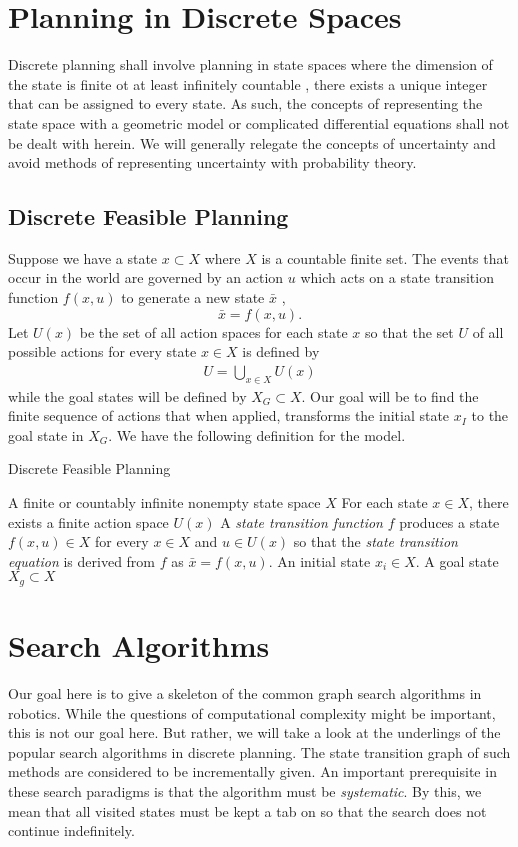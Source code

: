 \section{Planning in Discrete Spaces}
Discrete planning shall involve planning in state spaces where the dimension of the state is finite ot at least infinitely countable \ie, there exists a unique integer that can be assigned to every state. As such, the concepts of representing the state space with a geometric model or complicated differential equations shall not be dealt with herein. We will generally relegate the concepts of uncertainty and avoid methods of representing uncertainty with probability theory.

\subsection{Discrete Feasible Planning}
Suppose we have a state $x \subset X$  where $X$ is a countable finite set.  The events that occur in the world are governed by an action $u$ which acts on a state transition function $f(x, u)$ to generate a new state $\bar{x}$ \ie, 
\[
\bar{x} = f(x, u).
\]
%
Let $U(x)$ be the set of all action spaces for each state $x$ so that the set $U$ of all  possible actions for every state $x \in X$ is defined by 
%
\begin{align}
	U = \bigcup_{x\in X} U(x)
\end{align}
%
while the goal states will be defined by $X_G \subset X$. Our goal will be to find the finite sequence of actions that when applied, transforms the initial state $x_I$ to the goal state in $X_G$. We have the following definition for the model.
%
\begin{algorithm}[tbph!]
	\begin{algorithmic}[1]
		\caption{Discrete Feasible Planning}
		\Require A finite or countably infinite nonempty state space $X$
		\State For each state $x \in X$, there exists a finite action space $U(x)$
		\State A \textit{state transition function} $f$ produces a state $f(x, u) \in X$ for every $x \in X$ and $u \in U(x)$ so that the \textit{state transition equation} is derived from $f$ as $\bar{x} = f(x,u)$.
		\State An initial state $x_i \in X$.
		\State A goal state $X_g \subset X$
	\end{algorithmic}
\end{algorithm}

\section{Search Algorithms}
%
Our goal here is to give a skeleton of the common graph search algorithms in robotics. While the questions of computational complexity might be important, this is not our goal here. But rather, we will take a look at the underlings of the popular search algorithms in discrete planning. The state transition graph of such methods are considered to be incrementally given. An important prerequisite in these search paradigms is that the algorithm must be \textit{systematic}. By this, we mean that all visited states must be kept a tab on so that the search does not continue indefinitely. 

